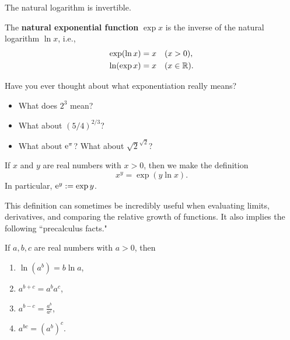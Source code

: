 

\begin{theorem}
The natural logarithm is invertible.
\end{theorem}
\begin{definition}
The \textbf{natural exponential function} $\exp x $ is the inverse of the natural logarithm $\ln x$, i.e.,
\begin{align*}
\exp(\ln x) &= x \quad (x>0),\\
\ln (\exp x) &= x \quad (x\in\mathbb R).
\end{align*}
\end{definition}


\begin{remark}
Have you ever thought about what exponentiation really means?
\begin{itemize}
\item What does $2^3$ mean?
\vspace{2in}
\item What about $(5/4)^{2/3}$?
\vspace{2.5in}
\item What about $\mathrm{e}^\pi$? What about ${\sqrt 2}^{\sqrt 2}$?
\vspace{0.1in}
\end{itemize}
\end{remark}

\newpage

\begin{definition}
If $x$ and $y$ are real numbers with $x>0$, then we make the definition
\begin{equation*}
x^y = \exp(y\ln x).
\end{equation*}
In particular, $\mathrm{e}^y := \exp y$.
\end{definition}

\begin{remark}
This definition can sometimes be incredibly useful when evaluating limits, derivatives, and comparing the relative growth of functions.
It also implies the following ``precalculus facts."
\end{remark}

\begin{theorem}
If $a, b, c$ are real numbers with $a>0$, then
\begin{enumerate}
\item $\ln(a^b) = b\ln a$,
\item $a^{b+c} = a^ba^c$,
\item $a^{b-c} = \frac{a^b}{a^c}$,
\item $a^{bc} = (a^b)^c$.
\end{enumerate}
\end{theorem}

